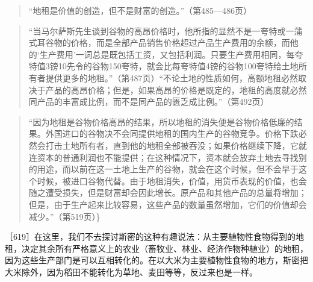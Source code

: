 \begin{quote}“地租是价值的创造，但不是财富的创造。”（第485—486页）\end{quote}

\begin{quote}“当马尔萨斯先生谈到谷物的高昂价格时，他所指的显然不是一夸特或一蒲式耳谷物的价格，而是全部产品销售价格超过产品生产费用的余额，而他的‘生产费用’一词总是既包括工资，又包括利润。只要生产费用相同，每夸特值3镑10先令的谷物150夸特，就会比每夸特值4镑的谷物100夸特给土地所有者提供更多的地租。”（第487页）“不论土地的性质如何，高额地租必然取决于产品的高昂价格；但是，如果高昂的价格是既定的，地租的高度就必然同产品的丰富成比例，而不是同产品的匮乏成比例。”（第492页）\end{quote}

\begin{quote}“因为地租是谷物价格高昂的结果，所以地租的消失便是谷物价格低廉的结果。外国进口的谷物决不会同提供地租的国内生产的谷物竞争。价格下跌必然会打击土地所有者，直到他的地租全部被吞没；如果价格继续下降，它就连资本的普通利润也不能提供；在这种情况下，资本就会放弃土地去寻找别的用途，而以前在这一土地上生产的谷物，就会在这个时候，但不会早于这个时候，被进口谷物代替。由于地租消失，价值，用货币表现的价值，也会随之遭受损失，但是财富却会因此增长。原产品和其他产品的总量将增加；但是，由于生产起来比较容易，这些产品的数量虽然增加，它们的价值却会减少。”（第519页）\}\end{quote}



［619］在这里，我们不去探讨斯密的这种有趣说法：从主要植物性食物得到的地租，决定其余所有严格意义上的农业（畜牧业、林业、经济作物种植业）的地租，因为这些生产部门是可以互相转化的。在以大米为主要植物性食物的地方，斯密把大米除外，因为稻田不能转化为草地、麦田等等，反过来也是一样。

